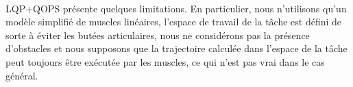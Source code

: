 \documentclass[pdftex,a4paper,11pt]{article}
\begin{document}
%
%
%
%


%


\paragraph{}

LQP+QOPS présente quelques limitations.  En particulier, nous
n'utilisons qu'un modèle simplifié de muscles linéaires, l'espace de travail de
la tâche est défini de sorte à éviter les butées articulaires, nous ne
considérons pas la présence d'obstacles et nous supposons que la trajectoire
calculée dans l'espace de la tâche peut toujours être exécutée par les muscles,
ce qui n'est pas vrai dans le cas général.
\end{document}

